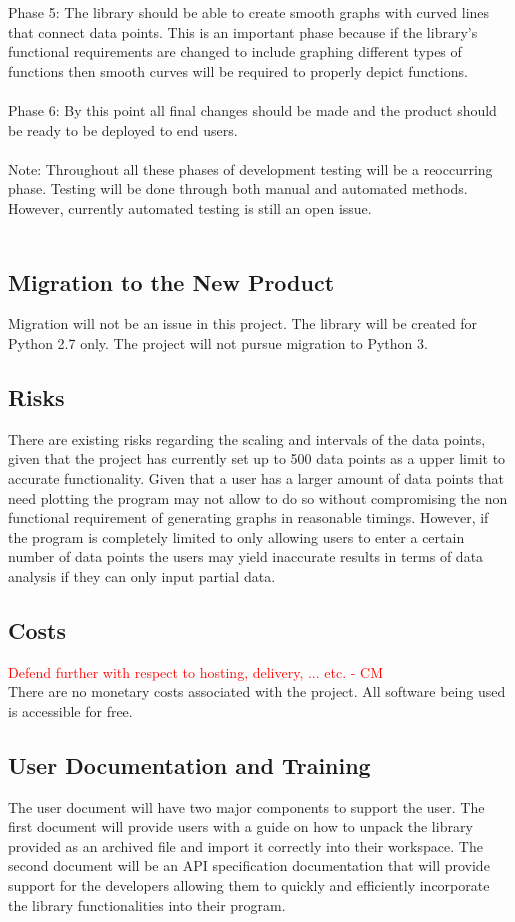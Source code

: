 \documentclass[12pt, titlepage]{article}
\begin{document}
Phase 5: The library should be able to create smooth graphs with curved lines that connect data points. This is an important phase because if the library's functional requirements are changed to include graphing different types of functions then smooth curves will be required to properly depict functions.\\ \\
Phase 6: By this point all final changes should be made and the product should be ready to be deployed to end users.\\ \\
Note: Throughout all these phases of development testing will be a reoccurring phase. Testing will be done through both manual and automated methods. However, currently automated testing is still an open issue. \\ \\

\subsection{Migration to the New Product}
Migration will not be an issue in this project. The library will be created for Python 2.7 only. The project will not pursue migration to Python 3.
\subsection{Risks}
There are existing risks regarding the scaling and intervals of the data points, given that the project has currently set up to 500 data points as a upper limit to accurate functionality. Given that a user has a larger amount of data points that need plotting the program may not allow to do so without compromising the non functional requirement of generating graphs in reasonable timings. However, if the program is completely limited to only allowing users to enter a certain number of data points the users may yield inaccurate results in terms of data analysis if they can only input partial data.
\subsection{Costs}
\textcolor{red}{Defend further with respect to hosting, delivery, ... etc. - CM} \\
There are no monetary costs associated with the project. All software being used is accessible for free.
\subsection{User Documentation and Training}
The user document will have two major components to support the user. The first document will provide users with a guide on how to unpack the library provided as an archived file and import it correctly into their workspace. The second document will be an API specification documentation that will provide support for the developers allowing them to quickly and efficiently incorporate the library functionalities into their program.

\end{document}
